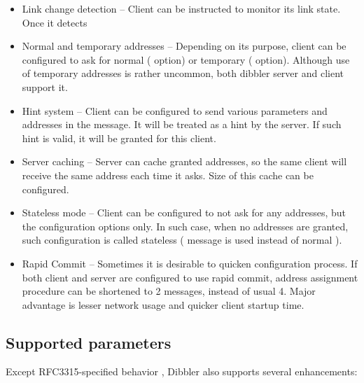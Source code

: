 \begin{itemize}
\item Link change detection -- Client can be instructed to monitor its
      link state. Once it detects
\item Normal and temporary addresses -- Depending on its purpose,
      client can be configured to ask for normal ( option)
      or temporary ( option). Although use of temporary
      addresses is rather uncommon, both dibbler server and client
      support it.
\item Hint system -- Client can be configured to send various parameters
      and addresses in the  message. It will be treated as
      a hint by the server. If such hint is valid, it will be granted
      for this client.
\item Server caching -- Server can cache granted addresses, so the same
      client will receive the same address each time it asks. Size of
      this cache can be configured.
\item Stateless mode -- Client can be configured to not ask for any
      addresses, but the configuration options only. In such case, when
      no addresses are granted, such configuration is called stateless
      ( message is used instead of normal
      ).
\item Rapid Commit -- Sometimes it is desirable to quicken configuration
      process. If both client and server are configured to use rapid
      commit, address assignment procedure can be shortened to 2
      messages, instead of usual 4. Major advantage is lesser network
      usage and quicker client startup time.
\end{itemize}

\subsection{Supported parameters}
Except RFC3315-specified behavior \cite{rfc3315}, Dibbler also supports
several enhancements:

